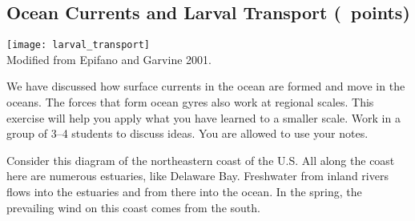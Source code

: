 \documentclass[12pt, addpoints]{exam}
\begin{document}
\subsection*{Ocean Currents and Larval Transport (\numpoints\ points)}

\begin{multicols}{2}

\noindent\texttt{[image: larval\_transport]}\\
{\footnotesize Modified from Epifano and Garvine 2001.}

\columnbreak

We have discussed how surface currents in the ocean are formed and move in the oceans.  The forces that form ocean gyres also work at regional scales. 
This exercise will help you apply what you have learned to a smaller scale.
Work in a group of 3–4 students to discuss ideas. You are allowed 
to use your notes.

Consider this diagram of the northeastern coast of the U.S.  All along the coast here are numerous estuaries, like Delaware Bay. Freshwater from inland rivers flows into the estuaries and from there into the ocean. In the spring, the prevailing wind on this coast comes from the south. 

\end{multicols}
\end{document}
